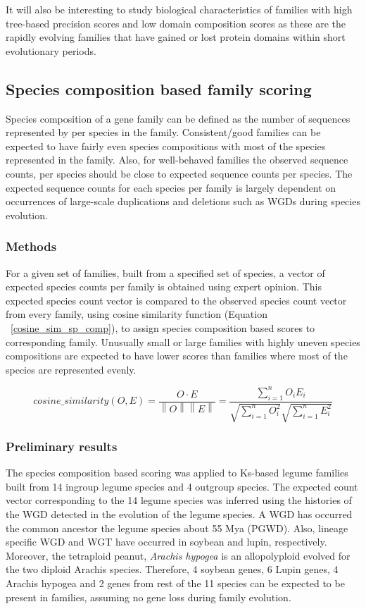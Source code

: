 \documentclass{article}
\newcommand{\norm}[1]{\left\lVert#1\right\rVert}
\begin{document}
	It will also be interesting to study biological characteristics of families with high tree-based precision scores and low domain composition scores as these are the rapidly evolving families that have gained or lost protein domains within short evolutionary periods.
	
	
	\subsection{Species composition based family scoring}
	Species composition of a gene family can be defined as the number of sequences represented by per species in the family. Consistent/good families can be expected to have fairly even species compositions with most of the species represented in the family. Also, for well-behaved families the observed sequence counts, per species should be close to expected sequence counts per species. The expected sequence counts for each species per family is largely dependent on occurrences of large-scale duplications and deletions such as WGDs during species evolution.
		
		\subsubsection{Methods}
		For a given set of families, built from a specified set of species, a vector of expected species counts per family is obtained using expert opinion. This expected species count vector is compared to the observed species count vector from every family, using cosine similarity function (Equation ~\ref{cosine_sim_sp_comp}), to assign species composition based scores to corresponding family. Unusually small or large families with highly uneven species compositions are expected to have lower scores than families where most of the species are represented evenly.
		
		\begin{equation}
		cosine\_similarity(O,E) = \frac{O \cdot E}{\norm O \norm E}
		= \frac{\sum_{i=1}^{n} O_i E_i}{\sqrt{\sum_{i=1}^{n} O_i^2} \sqrt{\sum_{i=1}^{n} E_i^2}}
		\label{cosine_sim_sp_comp}
		\end{equation}
		
		\subsubsection{Preliminary results}
		The species composition based scoring  was applied to Ks-based legume families built from 14 ingroup legume species and 4 outgroup species. The expected count vector corresponding to the 14 legume species was inferred using the histories of the WGD detected in the evolution of the legume species. A WGD has occurred the common ancestor the legume species about 55 Mya (PGWD). Also, lineage specific  WGD and WGT have occurred in soybean and lupin, respectively. Moreover, the tetraploid peanut, \textit{Arachis hypogea} is an allopolyploid evolved for the two diploid Arachis species. Therefore, 4 soybean genes, 6 Lupin genes, 4 Arachis hypogea and 2 genes from rest of the 11 species can be expected to be present in families, assuming no gene loss during family evolution.
		
\end{document}
